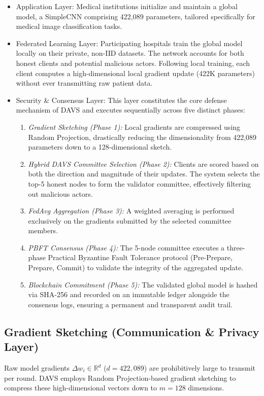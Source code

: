 \documentclass[conference]{IEEEtran}
\begin{document}
\begin{itemize}
    \item Application Layer: Medical institutions initialize and maintain a global model, a SimpleCNN comprising 422,089 parameters, tailored specifically for medical image classification tasks.
    
    \item Federated Learning Layer: Participating hospitals train the global model locally on their private, non-IID datasets. The network accounts for both honest clients and potential malicious actors. Following local training, each client computes a high-dimensional local gradient update (422K parameters) without ever transmitting raw patient data.
    
    \item Security \& Consensus Layer: This layer constitutes the core defense mechanism of DAVS and executes sequentially across five distinct phases:
    \begin{enumerate}
        \item \textit{Gradient Sketching (Phase 1):} Local gradients are compressed using Random Projection, drastically reducing the dimensionality from 422,089 parameters down to a 128-dimensional sketch.
        \item \textit{Hybrid DAVS Committee Selection (Phase 2):} Clients are scored based on both the direction and magnitude of their updates. The system selects the top-5 honest nodes to form the validator committee, effectively filtering out malicious actors.
        \item \textit{FedAvg Aggregation (Phase 3):} A weighted averaging is performed exclusively on the gradients submitted by the selected committee members.
        \item \textit{PBFT Consensus (Phase 4):} The 5-node committee executes a three-phase Practical Byzantine Fault Tolerance protocol (Pre-Prepare, Prepare, Commit) to validate the integrity of the aggregated update.
        \item \textit{Blockchain Commitment (Phase 5):} The validated global model is hashed via SHA-256 and recorded on an immutable ledger alongside the consensus logs, ensuring a permanent and transparent audit trail.
    \end{enumerate}
\end{itemize}

\subsection{Gradient Sketching (Communication \& Privacy Layer)}
Raw model gradients $\Delta w_i \in \mathbb{R}^d$ ($d = 422{,}089$) are prohibitively large to transmit per round. DAVS employs Random Projection-based gradient sketching to compress these high-dimensional vectors down to $m = 128$ dimensions. 
\end{document}
